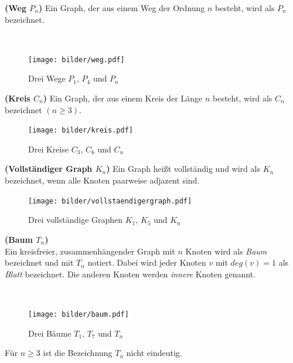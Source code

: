 \begin{defi}{\textbf{(Weg $P_n$)}}\newline
Ein Graph, der aus einem Weg der Ordnung $n$ besteht, wird als $P_n$ bezeichnet. \end{defi}
~\linebreak
\begin{figure}[h!]
		\centering 		 
   \texttt{[image: bilder/weg.pdf]}
	\caption{Drei Wege $P_1$, $P_4$ und $P_n$}
  	 \end{figure}

\begin{defi}{\textbf{(Kreis $C_n$)}}\newline
Ein Graph, der aus einem Kreis der Länge $n$ besteht, wird als $C_n$ bezeichnet $(n \geq 3)$. \end{defi}
\begin{figure}[h!]
		\centering 		 
   \texttt{[image: bilder/kreis.pdf]}
	\caption{Drei Kreise $C_3$, $C_6$ und $C_n$}
  	 \end{figure}
\begin{defi}{\textbf{(Vollständiger Graph $K_n$)}}\newline
Ein Graph heißt vollständig und wird als $K_n$ bezeichnet, wenn alle Knoten paarweise adjazent sind.
\end{defi}
\begin{figure}[h!]
		\centering 		 
   \texttt{[image: bilder/vollstaendigergraph.pdf]}
	\caption{Drei vollständige Graphen $K_1$, $K_5$ und $K_n$}
  	 \end{figure}

\begin{defi}{\textbf{(Baum $T_n$)}}\\
Ein kreisfreier, zusammenhängender Graph mit $n$ Knoten wird als \emph{Baum} bezeichnet und mit $T_n$ notiert. Dabei wird jeder Knoten $v$ mit $deg(v)=1$ als \emph{Blatt} bezeichnet. Die anderen Knoten werden \emph{innere} Knoten genannt. \end{defi}
~\linebreak
\vspace{-7mm}
\begin{figure}[h!]
		\centering 		 
   \texttt{[image: bilder/baum.pdf]}
	\caption{Drei Bäume $T_{1}$, $T_{7}$ und $T_{n}$}
  	 \end{figure}
\begin{bem}
Für $n \geq 3$ ist die Bezeichnung $T_n$ nicht eindeutig.  
\end{bem}

